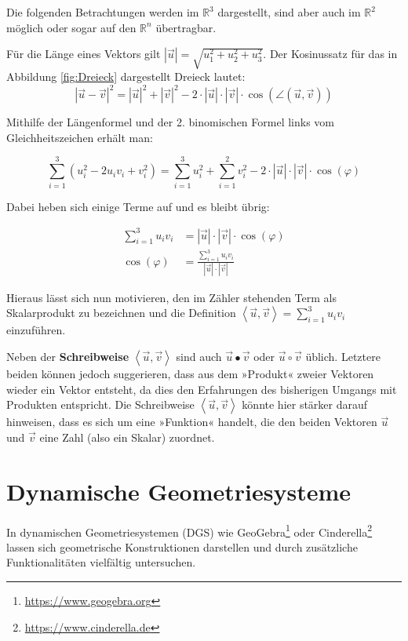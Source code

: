 \documentclass[
]{scrbook}
\theoremstyle{definition}
\theoremstyle{definition}
\theoremstyle{definition}
\theoremstyle{definition}
\theoremstyle{remark}
\begin{document}
Die folgenden Betrachtungen werden im \(\mathbb{R}^3\) dargestellt, sind aber auch im \(\mathbb{R}^2\) möglich oder sogar auf den \(\mathbb{R}^n\) übertragbar.

Für die Länge eines Vektors gilt \(|\vec u| = \sqrt{u_1^2+u_2^2+u_3^2}\). Der Kosinussatz für das in Abbildung \ref{fig:Dreieck} dargestellt Dreieck lautet: \[|\vec u-\vec v|^2 = |\vec u|^2 + |\vec v|^2 - 2\cdot|\vec u|\cdot |\vec v|\cdot \cos(\angle(\vec u,\vec v))\]

Mithilfe der Längenformel und der 2. binomischen Formel links vom Gleichheitszeichen erhält man:

\[\sum_{i=1}^3 (u_i^2-2u_iv_i + v_i^2) = \sum_{i=1}^3 u_i^2 + \sum_{i=1}^2 v_i^2 - 2\cdot|\vec u|\cdot |\vec v|\cdot \cos(\varphi)\]

Dabei heben sich einige Terme auf und es bleibt übrig:

\begin{align*}\sum_{i=1}^3 u_iv_i &= |\vec u|\cdot |\vec v|\cdot \cos(\varphi)\\ \cos(\varphi) &= \frac{\sum\limits_{i=1}^3 u_iv_i}{|\vec u|\cdot |\vec v|}\end{align*}

Hieraus lässt sich nun motivieren, den im Zähler stehenden Term als Skalarprodukt zu bezeichnen und die Definition \(\left<\vec u, \vec v\right> = \sum\limits_{i=1}^3 u_iv_i\) einzuführen.

Neben der \textbf{Schreibweise} \(\left <\vec u,\vec v\right>\) sind auch \(\vec u\bullet \vec v\) oder \(\vec u\circ \vec v\) üblich. Letztere beiden können jedoch suggerieren, dass aus dem »Produkt« zweier Vektoren wieder ein Vektor entsteht, da dies den Erfahrungen des bisherigen Umgangs mit Produkten entspricht. Die Schreibweise \(\left <\vec u,\vec v\right>\) könnte hier stärker darauf hinweisen, dass es sich um eine »Funktion« handelt, die den beiden Vektoren \(\vec u\) und \(\vec v\) eine Zahl (also ein Skalar) zuordnet.

\section{Dynamische Geometriesysteme}\label{dynamische-geometriesysteme}

In dynamischen Geometriesystemen (DGS) wie GeoGebra\footnote{\url{https://www.geogebra.org}} oder Cinderella\footnote{\url{https://www.cinderella.de}} lassen sich geometrische Konstruktionen darstellen und durch zusätzliche Funktionalitäten vielfältig untersuchen.
\end{document}
